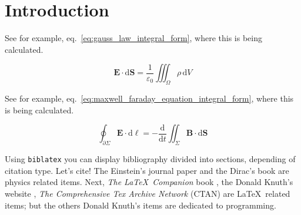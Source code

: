 \section{Introduction}

\kant[1-3] See for example, eq.~\ref{eq:gauss_law_integral_form}, where this is being calculated.

\begin{equation}
\label{eq:gauss_law_integral_form}
\mathbf {E} \cdot \mathrm {d} \mathbf {S} ={\frac {1}{\varepsilon _{0}}}\iiint _{\Omega }\rho \,\mathrm {d} V
\end{equation}

\kant[1] See for example, eq.~\ref{eq:maxwell_faraday_equation_integral_form}, where this is being calculated.

\begin{equation}
\label{eq:maxwell_faraday_equation_integral_form}
\oint_{\partial\Sigma} \mathbf{E} \cdot \mathrm{d}{\mathbf{\ell}}
=-{\frac {\mathrm{d}}{\mathrm{d}t}} \iint_{\Sigma}\mathbf{B}\cdot\mathrm{d}\mathbf{S} 
\end{equation}

Using \texttt{biblatex} you can display bibliography divided into sections,  depending of citation type. 
Let's cite! The Einstein's journal paper \cite{einstein} and the Dirac's book \cite{dirac} are physics related items. Next, \textit{The \LaTeX\ Companion} book \cite{latexcompanion}, the Donald Knuth's website \cite{knuthwebsite}, \textit{The Comprehensive Tex Archive Network} (CTAN) \cite{ctan} are \LaTeX\ related items; but the others Donald Knuth's items \cite{knuth-fa,knuth-acp} are dedicated to programming. 